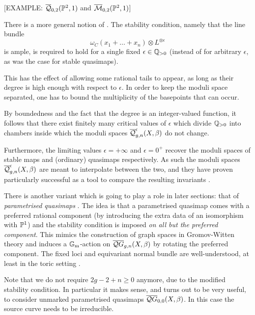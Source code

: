 [EXAMPLE: $\overline{\mathcal Q}_{0,2}(\mathbb P^2,1)$ and $\overline{\mathcal M}_{0,2}(\mathbb P^2,1)$]

\begin{remark}
 There is a more general notion of  \cite[\S 7.1]{CFKM}. The stability condition, namely that the line bundle
\begin{equation*} \omega_C(x_1 + \ldots + x_n)\otimes L^{\otimes \epsilon} \end{equation*} 
is ample, is required to hold for a single fixed $\epsilon \in \mathbb{Q}_{>0}$ (instead of for arbitrary $\epsilon$, as was the case for stable quasimaps).

This has the effect of allowing some rational tails to appear, as long as their degree is high enough with respect to $\epsilon$. In order to keep the moduli space separated, one has to bound the multiplicity of the basepoints that can occur.

By boundedness and the fact that the degree is an integer-valued function, it follows that there exist finitely many critical values of $\epsilon$ which divide $\mathbb{Q}_{>0}$ into chambers inside which the moduli spaces $\overline{\mathcal Q}^{\epsilon}_{g,n}(X,\beta)$ do not change.

Furthermore, the limiting values $\epsilon=+\infty$ and $\epsilon=0^+$ recover the moduli spaces of stable maps and (ordinary) quasimaps respectively. As such the moduli spaces $\overline{\mathcal Q}^{\epsilon}_{g,n}(X,\beta)$ are meant to interpolate between the two, and they have proven particularly successful as a tool to compare the resulting invariants \cite{CF-K-wallcrossing}.
\end{remark}

\begin{remark}
There is another variant which is going to play a role in later sections: that of \emph{parametrised quasimaps} \cite[\S 7]{CF-K}. The idea is that a parametrised quasimap comes with a preferred rational component (by introducing the extra data of an isomorphism with $\mathbb P^1$) and the stability condition is imposed \emph{on all but the preferred component}. This mimics the construction of graph spaces in Gromov-Witten theory and induces a $\mathbb{G}_{\text{m}}$-action on $\overline{\mathcal QG}_{g,n}(X,\beta)$ by rotating the preferred component. The fixed loci and equivariant normal bundle are well-understood, at least in the toric setting \cite[\S 7]{CF-K}.
 
Note that we do not require $2g-2+n\geq 0$ anymore, due to the modified stability condition. In particular it makes sense, and turns out to be very useful, to consider unmarked parametrised quasimaps $\overline{\mathcal QG}_{0,0}(X,\beta)$. In this case the source curve needs to be irreducible. 
\end{remark}

